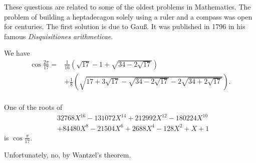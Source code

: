 \documentclass[solutions]{worksheet}
\begin{document}
\begin{solution}

  These questions are related to some of the oldest problems in Mathematics.
  The problem of building a heptadecagon solely using a ruler and a compass was
  open for centuries. The first solution is due to Gau{\ss}. It was published
  in 1796 in his famous \emph{Disquisitiones arithmeticae}.

  \begin{answers}

    \answer We have
      \begin{align*}
        \cos\frac{2\pi}{17} = &   \frac{1}{16}\left(\sqrt{17}-1+\sqrt{34-2\sqrt{17}}\right)\\
                              & + \frac{1}{8} \left(\sqrt{17+3\sqrt{17}
                                                          - \sqrt{34-2\sqrt{17}}
                                                          - 2\sqrt{34+2\sqrt{17}}} \right).\\
      \end{align*}

    \answer One of the roots of
      \begin{align*}
        & 32768 X^{16} - 131072 X^{14} + 212992 X^{12} - 180224 X^{10} \\
        & + 84480 X^8 - 21504 X^6 + 2688 X^4 - 128 X^2 + X + 1
      \end{align*}
      is $\cos \frac {\pi} {17}$.

    \answer Unfortunately, no, by Wantzel's theorem.

  \end{answers}

\end{solution}
\end{document}
